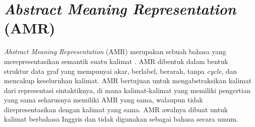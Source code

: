 \section{\textit{Abstract Meaning Representation} (AMR)}

\textit{Abstract Meaning Representation} (AMR) merupakan sebuah bahasa yang merepresentasikan semantik suatu kalimat .
AMR dibentuk dalam bentuk struktur data graf yang mempunyai akar, berlabel, berarah, tanpa \textit{cycle}, dan mencakup keseluruhan kalimat.
AMR bertujuan untuk mengabstraksikan kalimat dari representasi sintaktiknya, di mana kalimat-kalimat yang memiliki pengertian yang sama seharusnya memiliki AMR yang sama, walaupun tidak direpresentasikan dengan kalimat yang sama.
AMR awalnya dibuat untuk kalimat berbahasa Inggris dan tidak digunakan sebagai bahasa secara umum.


